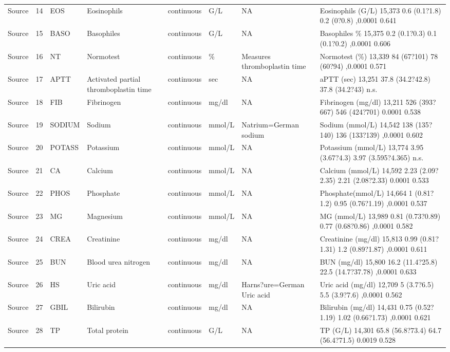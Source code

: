\documentclass[
  letterpaper,
  DIV=11,
  numbers=noendperiod]{scrreport}
\begin{document}
\begin{longtable}{lrllllll}
Source & 14 & EOS & Eosinophils & continuous & G/L & NA & Eosinophils (G/L) 15,373 0.6 (0.1?1.8) 0.2 (0?0.8) ,0.0001 0.641 \\ 
Source & 15 & BASO & Basophiles & continuous & G/L & NA & Basophiles \% 15,375 0.2 (0.1?0.3) 0.1 (0.1?0.2) ,0.0001 0.606 \\ 
Source & 16 & NT & Normotest & continuous & \% & Measures thromboplastin time & Normotest (\%) 13,339 84 (67?101) 78 (60?94) ,0.0001 0.571 \\ 
Source & 17 & APTT & Activated partial thromboplastin time & continuous & sec & NA & aPTT (sec) 13,251 37.8 (34.2?42.8) 37.8 (34.2?43) n.s. \\ 
Source & 18 & FIB & Fibrinogen & continuous & mg/dl & NA & Fibrinogen (mg/dl) 13,211 526 (393?667) 546 (424?701) 0.0001 0.538 \\ 
Source & 19 & SODIUM & Sodium & continuous & mmol/L & Natrium=German sodium & Sodium (mmol/L) 14,542 138 (135?140) 136 (133?139) ,0.0001 0.602 \\ 
Source & 20 & POTASS & Potassium & continuous & mmol/L & NA & Potassium (mmol/L) 13,774 3.95 (3.67?4.3) 3.97 (3.595?4.365) n.s. \\ 
Source & 21 & CA & Calcium & continuous & mmol/L & NA & Calcium (mmol/L) 14,592 2.23 (2.09?2.35) 2.21 (2.08?2.33) 0.0001 0.533 \\ 
Source & 22 & PHOS & Phosphate & continuous & mmol/L & NA & Phosphate(mmol/L) 14,664 1 (0.81?1.2) 0.95 (0.76?1.19) ,0.0001 0.537 \\ 
Source & 23 & MG & Magnesium & continuous & mmol/L & NA & MG (mmol/L) 13,989 0.81 (0.73?0.89) 0.77 (0.68?0.86) ,0.0001 0.582 \\ 
Source & 24 & CREA & Creatinine & continuous & mg/dl & NA & Creatinine (mg/dl) 15,813 0.99 (0.81?1.31) 1.2 (0.89?1.87) ,0.0001 0.611 \\ 
Source & 25 & BUN & Blood urea nitrogen & continuous & mg/dl & NA & BUN (mg/dl) 15,800 16.2 (11.4?25.8) 22.5 (14.7?37.78) ,0.0001 0.633 \\ 
Source & 26 & HS & Uric acid & continuous & mg/dl & Harns?ure=German Uric acid & Uric acid (mg/dl) 12,709 5 (3.7?6.5) 5.5 (3.9?7.6) ,0.0001 0.562 \\ 
Source & 27 & GBIL & Bilirubin & continuous & mg/dl & NA & Bilirubin (mg/dl) 14,431 0.75 (0.52?1.19) 1.02 (0.66?1.73) ,0.0001 0.621 \\ 
Source & 28 & TP & Total protein & continuous & G/L & NA & TP (G/L) 14,301 65.8 (56.8?73.4) 64.7 (56.4?71.5) 0.0019 0.528 \\ 

\end{longtable}
\end{document}
